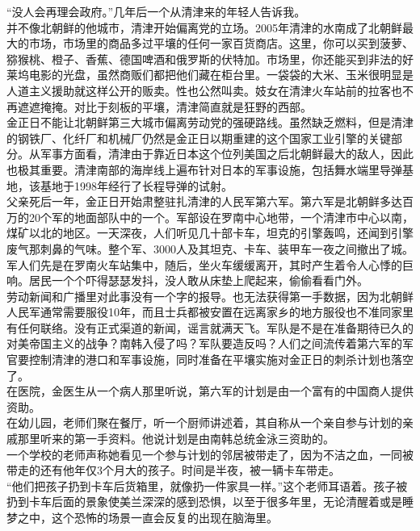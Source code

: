 “没人会再理会政府。”几年后一个从清津来的年轻人告诉我。\\

并不像北朝鲜的他城市，清津开始偏离党的立场。2005年清津的水南成了北朝鲜最大的市场，市场里的商品多过平壤的任何一家百货商店。这里，你可以买到菠萝、猕猴桃、橙子、香蕉、德国啤酒和俄罗斯的伏特加。市场里，你还能买到非法的好莱坞电影的光盘，虽然商贩们都把他们藏在柜台里。一袋袋的大米、玉米很明显是人道主义援助就这样公开的贩卖。性也公然叫卖。妓女在清津火车站前的拉客也不再遮遮掩掩。对比于刻板的平壤，清津简直就是狂野的西部。\\

金正日不能让北朝鲜第三大城市偏离劳动党的强硬路线。虽然缺乏燃料，但是清津的钢铁厂、化纤厂和机械厂仍然是金正日以期重建的这个国家工业引擎的关键部分。从军事方面看，清津由于靠近日本这个位列美国之后北朝鲜最大的敌人，因此也极其重要。清津南部的海岸线上遍布针对日本的军事设施，包括舞水端里导弹基地，该基地于1998年经行了长程导弹的试射。\\

父亲死后一年，金正日开始肃整驻扎清津的人民军第六军。第六军是北朝鲜多达百万的20个军的地面部队中的一个。军部设在罗南中心地带，一个清津市中心以南，煤矿以北的地区。一天深夜，人们听见几十部卡车，坦克的引擎轰鸣，还闻到引擎废气那刺鼻的气味。整个军、3000人及其坦克、卡车、装甲车一夜之间撤出了城。军人们先是在罗南火车站集中，随后，坐火车缓缓离开，其时产生着令人心悸的巨响。居民一个个吓得瑟瑟发抖，没人敢从床垫上爬起来，偷偷看看门外。\\

劳动新闻和广播里对此事没有一个字的报导。也无法获得第一手数据，因为北朝鲜人民军通常需要服役10年，而且士兵都被安置在远离家乡的地方服役也不准同家里有任何联络。没有正式渠道的新闻，谣言就满天飞。军队是不是在准备期待已久的对美帝国主义的战争？南韩入侵了吗？军队要造反吗？人们之间流传着第六军的军官要控制清津的港口和军事设施，同时准备在平壤实施对金正日的刺杀计划也落空了。\\

在医院，金医生从一个病人那里听说，第六军的计划是由一个富有的中国商人提供资助。\\

在幼儿园，老师们聚在餐厅，听一个厨师讲述着，其自称从一个亲自参与计划的亲戚那里听来的第一手资料。他说计划是由南韩总统金泳三资助的。\\

一个学校的老师声称她看见一个参与计划的邻居被带走了，因为不洁之血，一同被带走的还有他年仅3个月大的孩子。时间是半夜，被一辆卡车带走。\\

“他们把孩子扔到卡车后货箱里，就像扔一件家具一样。”这个老师耳语着。孩子被扔到卡车后面的景象使美兰深深的感到恐惧，以至于很多年里，无论清醒着或是睡梦之中，这个恐怖的场景一直会反复的出现在脑海里。\\

